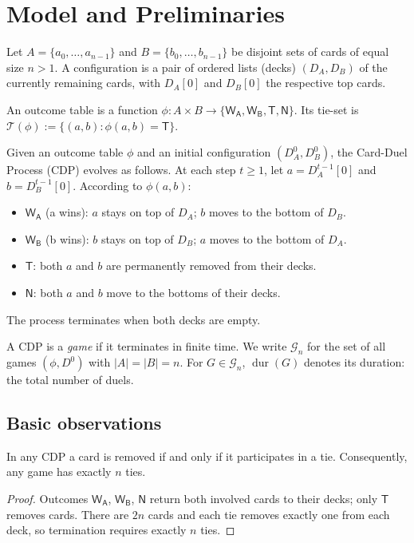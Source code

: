\documentclass[12pt]{article}
\DeclareMathOperator{\dur}{dur}
\newcommand{\WA}{\mathsf{W_A}}
\newcommand{\WB}{\mathsf{W_B}}
\newcommand{\TT}{\mathsf{T}}
\newcommand{\NN}{\mathsf{N}}
\begin{document}
\section{Model and Preliminaries}\label{sec:model}
Let $A=\{a_0,\dots,a_{n-1}\}$ and $B=\{b_0,\dots,b_{n-1}\}$ be disjoint sets of cards of equal size $n > 1$. A configuration is a pair of ordered lists (decks) $(D_A,D_B)$ of the currently remaining cards, with $D_A[0]$ and $D_B[0]$ the respective top cards.

\begin{definition} An outcome table is a function $\phi:A\times B\rightarrow\{\WA,\WB,\TT,\NN\}$. Its tie-set is $\mathcal{T}(\phi):=\{(a,b):\phi(a,b)=\TT\}$.
\end{definition}

\begin{definition} Given an outcome table $\phi$ and an initial configuration $(D_A^0,D_B^0)$, the Card-Duel Process (CDP) evolves as follows. At each step $t\ge 1$, let $a=D_A^{t-1}[0]$ and $b=D_B^{t-1}[0]$. According to $\phi(a,b)$:
\begin{itemize}[nosep]
    \item $\WA$ (a wins): $a$ stays on top of $D_A$; $b$ moves to the bottom of $D_B$.
    \item $\WB$ (b wins): $b$ stays on top of $D_B$; $a$ moves to the bottom of $D_A$.
    \item $\TT$: both $a$ and $b$ are permanently removed from their decks.
    \item $\NN$: both $a$ and $b$ move to the bottoms of their decks.
\end{itemize}
The process terminates when both decks are empty.
\end{definition}

\begin{definition} A CDP is a \emph{game} if it terminates in finite time. We write $\mathcal{G}_n$ for the set of all games $(\phi,D^0)$ with $|A|=|B|=n$. For $G\in\mathcal{G}_n$, $\dur(G)$ denotes its duration: the total number of duels.
\end{definition}

\subsection{Basic observations}
\begin{lemma} In any CDP a card is removed if and only if it participates in a tie. Consequently, any game has exactly $n$ ties.
\end{lemma}
\begin{proof}
Outcomes $\WA$, $\WB$, $\NN$ return both involved cards to their decks; only $\TT$ removes cards. There are $2n$ cards and each tie removes exactly one from each deck, so termination requires exactly $n$ ties.
\end{proof}
\end{document}
